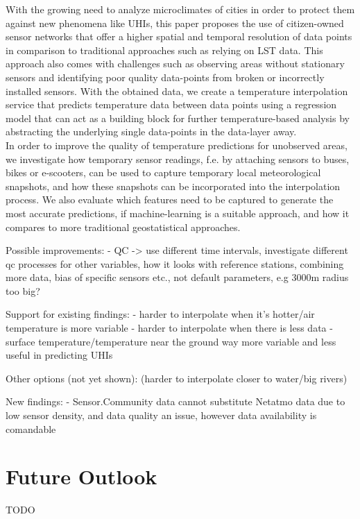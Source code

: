 With the growing need to analyze microclimates of cities in order to protect them against new phenomena like UHIs, this paper proposes the use of citizen-owned sensor networks that offer a higher spatial and temporal resolution of data points in comparison to traditional approaches such as relying on LST data. This approach also comes with challenges such as observing areas without stationary sensors and identifying poor quality data-points from broken or incorrectly installed sensors. With the obtained data, we create a temperature interpolation service that predicts temperature data between data points using a regression model that can act as a building block for further temperature-based analysis by abstracting the underlying single data-points in the data-layer away.\\
In order to improve the quality of temperature predictions for unobserved areas, we investigate how temporary sensor readings, f.e. by attaching sensors to buses, bikes or e-scooters, can be used to capture temporary local meteorological snapshots, and how these snapshots can be incorporated into the interpolation process. We also evaluate which features need to be captured to generate the most accurate predictions, if machine-learning is a suitable approach, and how it compares to more traditional geostatistical approaches.

Possible improvements:
- QC -> use different time intervals, investigate different qc processes for other variables, how it looks with reference stations, combining more data, bias of specific sensors etc., not default parameters, e.g 3000m radius too big?

Support for existing findings:
- harder to interpolate when it's hotter/air temperature is more variable
- harder to interpolate when there is less data
- surface temperature/temperature near the ground way more variable and less useful in predicting UHIs

Other options (not yet shown):
(harder to interpolate closer to water/big rivers)

New findings:
- Sensor.Community data cannot substitute Netatmo data due to low sensor density, and data quality an issue, however data availability is comandable


\section{Future Outlook}

TODO
